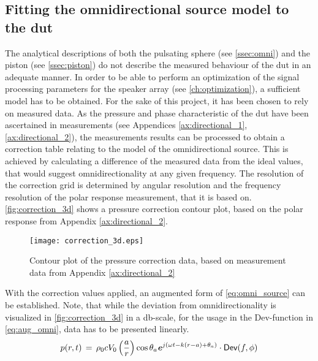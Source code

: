 \subsection{Fitting the omnidirectional source model to the \gls{dut}}\label{sec:correction}
The analytical descriptions of both the pulsating sphere (see \autoref{ssec:omni}) and the piston (see \autoref{ssec:piston}) do not describe the measured behaviour of the \gls{dut} in an adequate manner. In order to be able to perform an optimization of the signal processing parameters for the speaker array (see \autoref{ch:optimization}), a sufficient model has to be obtained. For the sake of this project, it has been chosen to rely on measured data.
As the pressure and phase characteristic of the \gls{dut} have been ascertained in measurements (see Appendices \ref{ax:directional_1},\ref{ax:directional_2}), the measurements results can be processed to obtain a correction table relating to the model of the omnidirectional source. This is achieved by calculating a difference of the measured data from the ideal values, that would suggest omnidirectionality at any given frequency. The resolution of the correction grid is determined by angular resolution and the frequency resolution of the polar response measurement, that it is based on.  \autoref{fig:correction_3d} shows a pressure correction contour plot, based on the polar response from Appendix \ref{ax:directional_2}.
\begin{figure}[H]
	\centering
	\texttt{[image: correction\_3d.eps]}
	\caption{Contour plot of the pressure correction data, based on measurement data from Appendix \ref{ax:directional_2}}
		\label{fig:correction_3d}
\end{figure}
With the correction values applied, an augmented form of \autoref{eq:omni_source} can be established. Note, that while the deviation from omnidirectionality is visualized in \autoref{fig:correction_3d} in a \si{\decibel}-scale, for the usage in the \textsf{Dev}-function in \autoref{eq:aug_omni}, data has to be presented linearly.
\begin{equation}\label{eq:aug_omni}
p(r,t)\,=\,\rho_0 c V_0 \left(\frac{a}{r}\right)\cos \theta_a \textbf{\textit{e}}^{j\left(\omega t - k(r-a)+\theta_a\right)}\cdot\textsf{Dev}(f,\phi)
\end{equation}

\startexplain
{}
\stopexplain



